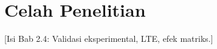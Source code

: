 \section{Celah Penelitian}
[Isi Bab 2.4: Validasi eksperimental, LTE, efek matriks.]














% 